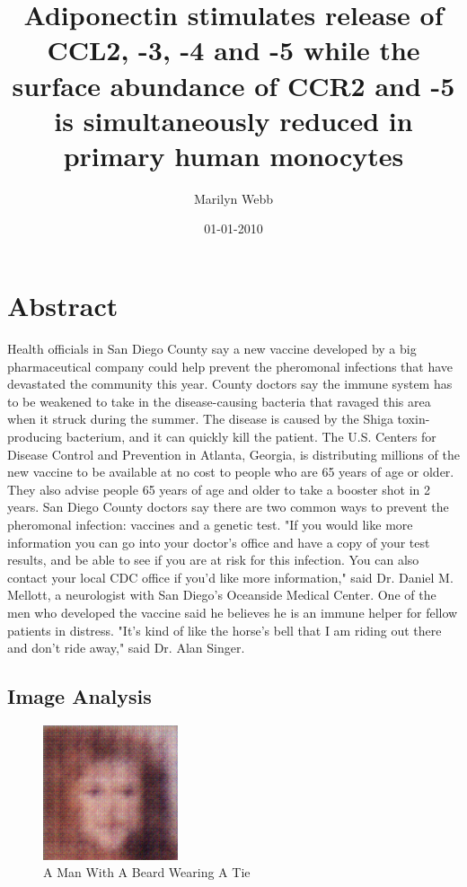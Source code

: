 \documentclass{article}%
\title{Adiponectin stimulates release of CCL2, {-}3, {-}4 and {-}5 while the surface abundance of CCR2 and {-}5 is simultaneously reduced in primary human monocytes}%
\author{Marilyn Webb}%
\affil{Institute of Orthopedic Surgery, Xijing Hospital, Fourth Military Medical University, Xian, Peoples Republic of China}%
\date{01{-}01{-}2010}%
\begin{document}
%
\normalsize%
\maketitle%
\section{Abstract}%
\label{sec:Abstract}%
Health officials in San Diego County say a new vaccine developed by a big pharmaceutical company could help prevent the pheromonal infections that have devastated the community this year.\newline%
County doctors say the immune system has to be weakened to take in the disease{-}causing bacteria that ravaged this area when it struck during the summer.\newline%
The disease is caused by the Shiga toxin{-}producing bacterium, and it can quickly kill the patient.\newline%
The U.S. Centers for Disease Control and Prevention in Atlanta, Georgia, is distributing millions of the new vaccine to be available at no cost to people who are 65 years of age or older.\newline%
They also advise people 65 years of age and older to take a booster shot in 2 years.\newline%
San Diego County doctors say there are two common ways to prevent the pheromonal infection: vaccines and a genetic test.\newline%
"If you would like more information you can go into your doctor's office and have a copy of your test results, and be able to see if you are at risk for this infection. You can also contact your local CDC office if you'd like more information," said Dr. Daniel M. Mellott, a neurologist with San Diego's Oceanside Medical Center.\newline%
One of the men who developed the vaccine said he believes he is an immune helper for fellow patients in distress.\newline%
"It's kind of like the horse's bell that I am riding out there and don't ride away," said Dr. Alan Singer.

%
\subsection{Image Analysis}%
\label{subsec:ImageAnalysis}%


\begin{figure}[h!]%
\centering%
\includegraphics[width=150px]{500_fake_images/samples_5_349.png}%
\caption{A Man With A Beard Wearing A Tie}%
\end{figure}

%
\end{document}
